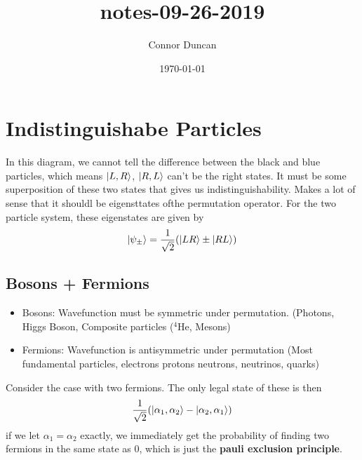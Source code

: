 \documentclass{article}
\author{Connor Duncan}
\date{\today}
\title{notes-09-26-2019}
\theoremstyle{definition}
\begin{document}
\section{Indistinguishabe Particles} \begin{center}  \end{center} In this diagram, we cannot tell the difference between the black and blue particles, which means $\ket{L,R}$, $\ket{R,L}$ can't be the right states. It must be some superposition of these two states that gives us indistinguishability. Makes a lot of sense that it shouldl be eigensttates ofthe permutation operator. For the two particle system, these eigenstates are given by \begin{equation} \ket{\psi_\pm}=\frac{1}{\sqrt{2}}(\ket{LR}\pm\ket{RL}) \end{equation} \subsection{Bosons + Fermions} \begin{itemize} \item Bosons: Wavefunction must be symmetric under permutation. (Photons, Higgs Boson, Composite particles ($^4$He, Mesons) \item Fermions: Wavefunction is antisymmetric under permutation (Most fundamental particles, electrons protons neutrons, neutrinos, quarks) \end{itemize} Consider the case with two fermions. The only legal state of these is then \begin{equation} \frac{1}{\sqrt{2}}(\ket{\alpha_1,\alpha_2}-\ket{\alpha_2,\alpha_1}) \end{equation} if we let $\alpha_1=\alpha_2$ exactly, we immediately get the probability of finding two fermions in the same state as 0, which is just the \textbf{pauli exclusion principle}.
\end{document}
